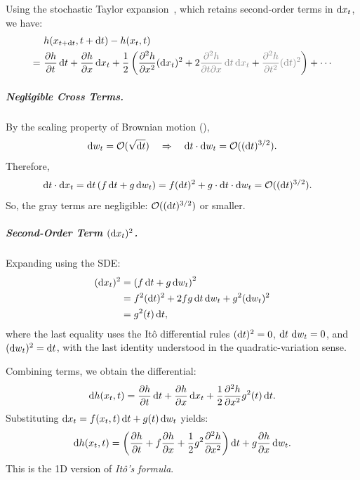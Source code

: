 Using the stochastic Taylor expansion~\citep{kloeden1992stochastic}, which retains second-order terms in $\mathop{}\!\mathrm{d} x_t$, we have:
\begin{align*}
&h(x_{t+\diff t}, t+\diff t) 
- h(x_t, t) \\
=~&\frac{\partial h}{\partial t} \diff t 
+ \frac{\partial h}{\partial x} \diff x_t 
+ \frac{1}{2} \left( \frac{\partial^2 h}{\partial x^2} (\diff x_t)^2 
+ 2\textcolor{gray}{{\frac{\partial^2 h}{\partial t \partial x} \diff t \diff x_t}} 
+ \textcolor{gray}{{ \frac{\partial^2 h}{\partial t^2} (\diff t)^2}} \right)
+ \cdots
\end{align*}
\subparagraph{Negligible Cross Terms.}
By the scaling property of Brownian motion (), 
\[
\mathop{}\!\mathrm{d} w_t = \mathcal{O}(\sqrt{\mathop{}\!\mathrm{d} t}) \quad \Rightarrow \quad \mathop{}\!\mathrm{d} t \cdot \mathop{}\!\mathrm{d} w_t = \mathcal{O}((\mathop{}\!\mathrm{d} t)^{3/2}).
\]
Therefore,
\begin{align*}
\diff t \cdot \diff x_t 
&= \diff t \left(f \diff t + g \diff w_t\right) 
= f (\diff t)^2 + g \cdot \diff t \cdot \diff w_t 
= \mathcal{O}((\diff t)^{3/2}).
\end{align*}
So, the gray terms are negligible: $ \mathcal{O}((\mathop{}\!\mathrm{d} t)^{3/2}) $ or smaller.
\subparagraph{Second-Order Term $(\mathop{}\!\mathrm{d} x_t)^2$.}
Expanding using the SDE:
\begin{align*}
(\diff x_t)^2 
&= \left( f \diff t + g \diff w_t \right)^2 \\
&= f^2 (\diff t)^2 + 2fg \diff t \diff w_t + g^2 (\diff w_t)^2 \\
&= g^2(t) \diff t,
\end{align*}
where the last equality uses the It\^o differential rules
$(\mathop{}\!\mathrm{d} t)^2=0$, $\mathop{}\!\mathrm{d} t\,\mathop{}\!\mathrm{d} w_t=0$, and
$(\mathop{}\!\mathrm{d} w_t)^2=\mathop{}\!\mathrm{d} t$, with the last identity understood in the
quadratic-variation sense.

Combining terms, we obtain the differential:
\[
\mathop{}\!\mathrm{d} h(x_t, t)
= \frac{\partial h}{\partial t} \mathop{}\!\mathrm{d} t
+ \frac{\partial h}{\partial x} \mathop{}\!\mathrm{d} x_t
+ \frac{1}{2} \frac{\partial^2 h}{\partial x^2} g^2(t) \mathop{}\!\mathrm{d} t.
\]
Substituting $ \mathop{}\!\mathrm{d} x_t = f(x_t, t) \mathop{}\!\mathrm{d} t + g(t) \mathop{}\!\mathrm{d} w_t $ yields:
\[
\mathop{}\!\mathrm{d} h(x_t, t)
= \left( \frac{\partial h}{\partial t} + f \frac{\partial h}{\partial x}
+ \frac{1}{2} g^2 \frac{\partial^2 h}{\partial x^2} \right) \mathop{}\!\mathrm{d} t
+ g \frac{\partial h}{\partial x} \mathop{}\!\mathrm{d} w_t.
\]
This is the 1D version of \emph{It\^o's formula}.



